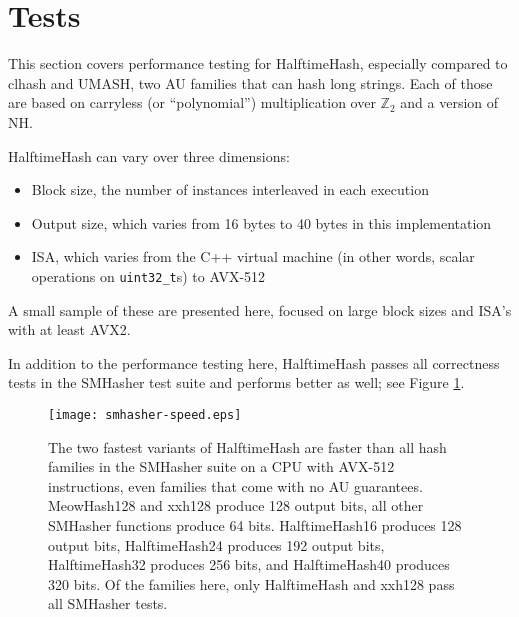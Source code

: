 \documentclass[runningheads]{llncs}
\newcommand{\ints}{\mathbb{Z}}
\begin{document}


\section{Tests}

This section covers performance testing for HalftimeHash, especially compared to clhash and UMASH, two AU families that can hash long strings.
Each of those are based on carryless (or ``polynomial'') multiplication over $\ints_2$ and a version of NH.

HalftimeHash can vary over three dimensions:

\begin{itemize}
\item Block size, the number of instances interleaved in each execution
\item Output size, which varies from 16 bytes to 40 bytes in this implementation
\item ISA, which varies from the C++ virtual machine (in other words, scalar operations on \texttt{uint32\_t}s) to AVX-512
\end{itemize}

A small sample of these are presented here, focused on large block sizes and ISA's with at least AVX2.

In addition to the performance testing here, HalftimeHash passes all correctness tests in the SMHasher test suite and performs better as well; see Figure \ref{smhasher-speed}.\cite{smhasher}

\begin{figure}
  \texttt{[image: smhasher-speed.eps]}
\caption{
  \label{smhasher-speed}
    The two fastest variants of HalftimeHash are faster than all hash families in the SMHasher suite on a CPU with AVX-512 instructions, even families that come with no AU guarantees. \protect\cite{smhasher}
    MeowHash128 and xxh128 produce 128 output bits, all other SMHasher functions produce 64 bits.
    HalftimeHash16 produces 128 output bits, HalftimeHash24 produces 192 output bits, HalftimeHash32 produces 256 bits, and HalftimeHash40 produces 320 bits.
    Of the families here, only HalftimeHash and xxh128 pass all SMHasher tests.
}
\end{figure}
\end{document}

